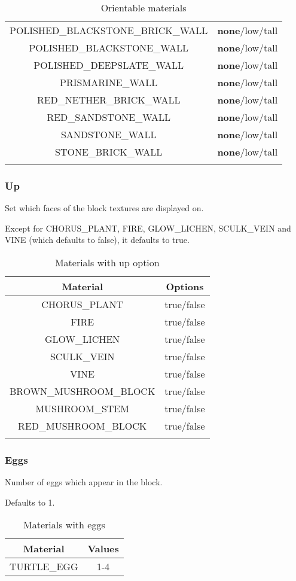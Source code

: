 \begin{longtable}{ |c|c| }
	POLISHED\_BLACKSTONE\_BRICK\_WALL & \textbf{none}/low/tall \\
	POLISHED\_BLACKSTONE\_WALL & \textbf{none}/low/tall \\
	POLISHED\_DEEPSLATE\_WALL & \textbf{none}/low/tall \\
	PRISMARINE\_WALL & \textbf{none}/low/tall \\
	RED\_NETHER\_BRICK\_WALL & \textbf{none}/low/tall \\
	RED\_SANDSTONE\_WALL & \textbf{none}/low/tall \\
	SANDSTONE\_WALL & \textbf{none}/low/tall \\
	STONE\_BRICK\_WALL & \textbf{none}/low/tall \\
	\hline
	\caption{Orientable materials}
\end{longtable}

\subsubsection{Up}
Set which faces of the block textures are displayed on.

Except for CHORUS\_PLANT, FIRE, GLOW\_LICHEN, SCULK\_VEIN and VINE (which defaults to false), it defaults to true.

\begin{longtable}{ |c|c| }
	\hline
	Material & Options \\
	\hline
	\endhead
	CHORUS\_PLANT & true/false \\
	FIRE & true/false \\
	GLOW\_LICHEN & true/false \\
	SCULK\_VEIN & true/false \\
	VINE & true/false \\
	\hline
	BROWN\_MUSHROOM\_BLOCK & true/false \\
	MUSHROOM\_STEM & true/false \\
	RED\_MUSHROOM\_BLOCK & true/false \\
	\hline
	\caption{Materials with up option}
\end{longtable}

\subsubsection{Eggs}
Number of eggs which appear in the block.

Defaults to 1.

\begin{table}[H]
	\centering
	\begin{tabular}{ |c|c| }
		\hline
		Material & Values \\
		\hline
		TURTLE\_EGG & 1-4 \\
		\hline
	\end{tabular}
	\caption{Materials with eggs}
\end{table}

